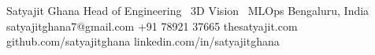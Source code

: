 
\providecommand{\resumetagline}{Head of Engineering \textperiodcentered\ 3D Vision \textperiodcentered\ MLOps}



\makeheader
  {Satyajit Ghana}
  {\resumetagline}
  {Bengaluru, India}
  {satyajitghana7@gmail.com}
  {+91 78921 37665}
  {thesatyajit.com}
  {github.com/satyajitghana}
  {linkedin.com/in/satyajitghana}

\providecommand{\secdir}{sections/}







